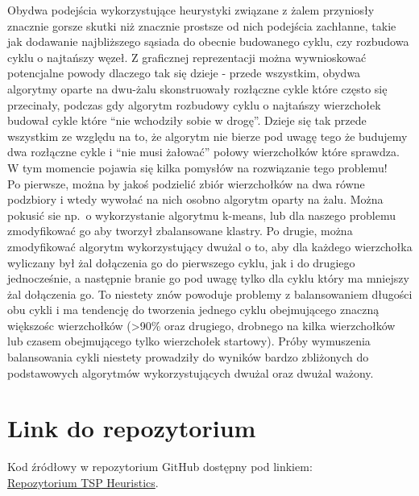 \documentclass[11pt]{article}
\begin{document}
Obydwa podejścia wykorzystujące heurystyki związane z żalem przyniosły znacznie gorsze skutki niż znacznie prostsze od nich podejścia zachłanne,
takie jak dodawanie najbliższego sąsiada do obecnie budowanego cyklu, czy rozbudowa cyklu o najtańszy węzeł.
Z graficznej reprezentacji można wywnioskować potencjalne powody dlaczego tak się dzieje - przede wszystkim, obydwa algorytmy oparte na dwu-żalu skonstruowały rozłączne cykle które często się przecinały,
podczas gdy algorytm rozbudowy cyklu o najtańszy wierzchołek budował cykle które ``nie wchodziły sobie w drogę''.
Dzieje się tak przede wszystkim ze względu na to, że algorytm nie bierze pod uwagę tego że budujemy dwa rozłączne cykle i ``nie musi żałować'' połowy wierzchołków które sprawdza.
W tym momencie pojawia się kilka pomysłów na rozwiązanie tego problemu! \\
Po pierwsze, można by jakoś podzielić zbiór wierzchołków na dwa równe podzbiory i wtedy wywołać na nich osobno algorytm oparty na żalu.
Można pokusić sie np.\ o wykorzystanie algorytmu k-means, lub dla naszego problemu zmodyfikować go aby tworzył zbalansowane klastry.
Po drugie, można zmodyfikować algorytm wykorzystujący dwużal o to, aby dla każdego wierzchołka wyliczany był żal dołączenia go do pierwszego cyklu, jak i do drugiego jednocześnie,
a następnie branie go pod uwagę tylko dla cyklu który ma mniejszy żal dołączenia go.
To niestety znów powoduje problemy z balansowaniem długości obu cykli i ma tendencję do tworzenia jednego cyklu obejmującego znaczną większośc wierzchołków
(>90\% oraz drugiego, drobnego na kilka wierzchołków lub czasem obejmującego tylko wierzchołek startowy).
Próby wymuszenia balansowania cykli niestety prowadziły do wyników bardzo zbliżonych do podstawowych algorytmów wykorzystujących dwużal oraz dwużal ważony.

\section{Link do repozytorium}\label{sec:link-do-repo}
Kod źródłowy w repozytorium GitHub dostępny pod linkiem: \\
\href{https://github.com/KotZPolibudy/PUT_IMO/tree/main/TSP_heuristic}{Repozytorium TSP Heuristics}.
\end{document}
